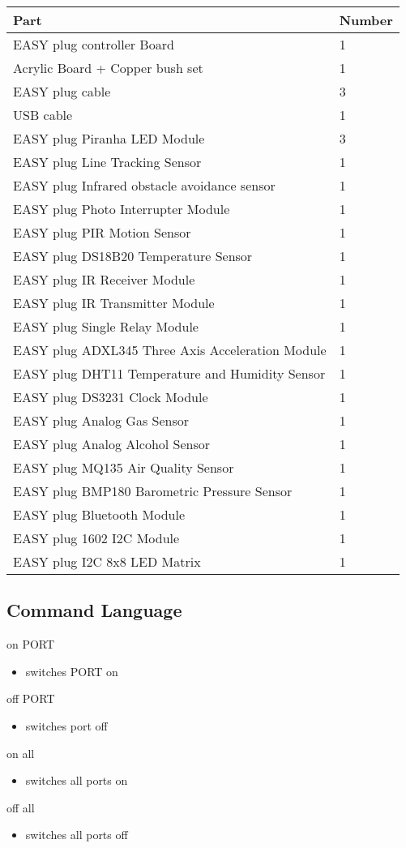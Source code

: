 \begin{longtable}[]{@{}ll@{}}
\toprule
Part & Number\tabularnewline
\midrule
\endhead
EASY plug controller Board & 1\tabularnewline
Acrylic Board + Copper bush set & 1\tabularnewline
EASY plug cable & 3\tabularnewline
USB cable & 1\tabularnewline
EASY plug Piranha LED Module & 3\tabularnewline
EASY plug Line Tracking Sensor & 1\tabularnewline
EASY plug Infrared obstacle avoidance sensor & 1\tabularnewline
EASY plug Photo Interrupter Module & 1\tabularnewline
EASY plug PIR Motion Sensor & 1\tabularnewline
EASY plug DS18B20 Temperature Sensor & 1\tabularnewline
EASY plug IR Receiver Module & 1\tabularnewline
EASY plug IR Transmitter Module & 1\tabularnewline
EASY plug Single Relay Module & 1\tabularnewline
EASY plug ADXL345 Three Axis Acceleration Module & 1\tabularnewline
EASY plug DHT11 Temperature and Humidity Sensor & 1\tabularnewline
EASY plug DS3231 Clock Module & 1\tabularnewline
EASY plug Analog Gas Sensor & 1\tabularnewline
EASY plug Analog Alcohol Sensor & 1\tabularnewline
EASY plug MQ135 Air Quality Sensor & 1\tabularnewline
EASY plug BMP180 Barometric Pressure Sensor & 1\tabularnewline
EASY plug Bluetooth Module & 1\tabularnewline
EASY plug 1602 I2C Module & 1\tabularnewline
EASY plug I2C 8x8 LED Matrix & 1\tabularnewline
\bottomrule
\end{longtable}

\subsection{Command Language}

on PORT

\begin{itemize}
\item
  switches PORT on
\end{itemize}

off PORT

\begin{itemize}
\item
  switches port off
\end{itemize}

on all

\begin{itemize}
\item
  switches all ports on
\end{itemize}

off all

\begin{itemize}
\item
  switches all ports off
\end{itemize}

